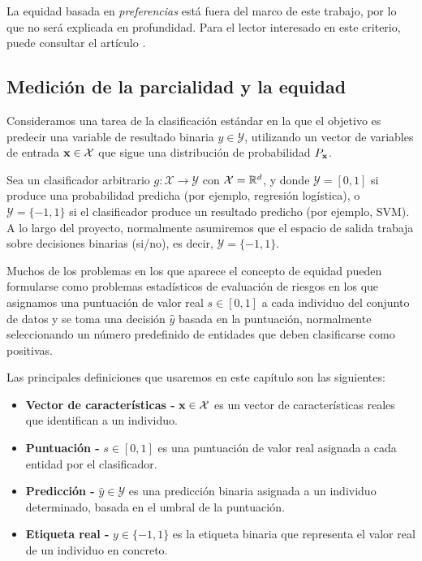 \documentclass[oneside,openright,titlepage,numbers=noenddot,openany,headinclude,footinclude=true,
cleardoublepage=empty,abstractoff,BCOR=5mm,paper=a4,fontsize=12pt,main=spanish]{scrreprt}
\begin{document}
La equidad basada en \textit{preferencias} está fuera del marco de este trabajo, por lo que no será explicada en profundidad. Para el lector interesado en este criterio, puede consultar el artículo \cite{preferences2017}.

\subsection{Medición de la parcialidad y la equidad}

Consideramos una tarea de la clasificación estándar en la que el objetivo es predecir una variable de resultado binaria $y \in \mathcal{Y}$, utilizando un vector de variables de entrada $\textbf{x} \in \mathcal{X}$ que sigue una distribución de probabilidad $P_{\textbf{x}}$.

Sea un clasificador arbitrario $g:\mathcal{X} \rightarrow \mathcal{Y}$ con $\mathcal{X}=\mathbb{R}^d$, y donde $\mathcal{Y}=[0,1]$ si produce una probabilidad predicha (por ejemplo, regresión logística), o $\mathcal{Y}=\{-1,1\}$ si el clasificador produce un resultado predicho (por ejemplo, SVM). A lo largo del proyecto, normalmente asumiremos que el espacio de salida trabaja sobre decisiones binarias (si/no), es decir, $\mathcal{Y}=\{-1,1\}$.

Muchos de los problemas en los que aparece el concepto de equidad pueden formularse como problemas estadísticos de evaluación de riesgos en los que asignamos una puntuación de valor real $s \in [0,1]$ a cada individuo del conjunto de datos y se toma una decisión $\hat{y}$ basada en la puntuación, normalmente seleccionando un número predefinido de entidades que deben clasificarse como positivas.

Las principales definiciones que usaremos en este capítulo son las siguientes:

\begin{itemize}
    \item \textbf{Vector de características -} $\textbf{x}\in \mathcal{X}$ es un vector de características reales que identifican a un individuo.
    \item \textbf{Puntuación -} $s \in [0,1]$ es una puntuación de valor real asignada a cada entidad por el clasificador.
    \item \textbf{Predicción -} $\hat{y} \in \mathcal{Y}$ es una predicción binaria asignada a un individuo determinado, basada en el umbral de la puntuación.
    \item \textbf{Etiqueta real -} $y \in \{-1,1\}$ es la etiqueta binaria que representa el valor real de un individuo en concreto.
\end{itemize}
\end{document}

